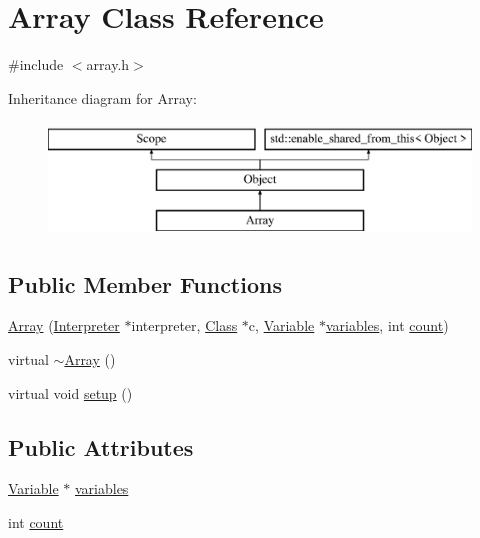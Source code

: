 \hypertarget{classArray}{}\section{Array Class Reference}
\label{classArray}


{\ttfamily \#include $<$array.\+h$>$}

Inheritance diagram for Array\+:\begin{figure}[H]
\begin{center}
\leavevmode
\includegraphics[height=3.000000cm]{classArray}
\end{center}
\end{figure}
\subsection*{Public Member Functions}
\begin{DoxyCompactItemize}
\item 
\hyperlink{classArray_a6bf7af2f8348ab6b96a656c2f2ea27ed}{Array} (\hyperlink{classInterpreter}{Interpreter} $\ast$interpreter, \hyperlink{classClass}{Class} $\ast$c, \hyperlink{classVariable}{Variable} $\ast$\hyperlink{classArray_af685a2298bef03e179093d6791c75b40}{variables}, int \hyperlink{classArray_a11dfcc73b3484e2bfdb5ce81457a7650}{count})
\item 
virtual \hyperlink{classArray_a66d3fee8e78097d35709028b3ba02803}{$\sim$\+Array} ()
\item 
virtual void \hyperlink{classArray_ac9828e89510c879b36acc6eca5efef51}{setup} ()
\end{DoxyCompactItemize}
\subsection*{Public Attributes}
\begin{DoxyCompactItemize}
\item 
\hyperlink{classVariable}{Variable} $\ast$ \hyperlink{classArray_af685a2298bef03e179093d6791c75b40}{variables}
\item 
int \hyperlink{classArray_a11dfcc73b3484e2bfdb5ce81457a7650}{count}
\end{DoxyCompactItemize}


